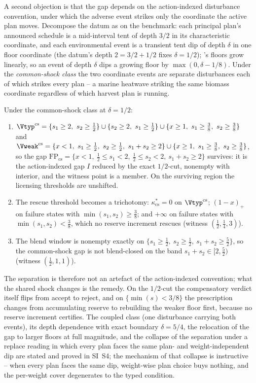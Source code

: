 A second objection is that the gap depends on the action-indexed disturbance convention, under which the adverse event strikes only the coordinate the active plan moves. Decompose the datum as on the benchmark: each principal plan's announced schedule is a mid-interval tent of depth $3/2$ in its characteristic coordinate, and each environmental event is a transient tent dip of depth $\delta$ in one floor coordinate (the datum's depth $2=3/2+1/2$ fixes $\delta=1/2$); 's floors grow linearly, so an event of depth $\delta$ dips a growing floor by $\max(0,\delta-1/8)$. Under the \emph{common-shock class} the two coordinate events are separate disturbances each of which strikes every plan -- a marine heatwave striking the same biomass coordinate regardless of which harvest plan is running.

\begin{proposition}\label{prop:commonshock}
Under the common-shock class at $\delta=1/2$:
\begin{enumerate}[label=\textup{(\roman*)},leftmargin=2em]
\item $\Vtyp^{\mathrm{cs}}=\{s_1\ge2,\ s_2\ge\tfrac12\}\cup\{s_2\ge2,\ s_1\ge\tfrac12\}\cup\{x\ge1,\ s_1\ge\tfrac38,\ s_2\ge\tfrac38\}$ and
$\Vweak^{\mathrm{cs}}=\{x<1,\ s_1\ge\tfrac12,\ s_2\ge\tfrac12,\ s_1+s_2\ge2\}\cup\{x\ge1,\ s_1\ge\tfrac38,\ s_2\ge\tfrac38\}$, so the gap
$\mathrm{FP}_{\mathrm{cs}}=\{x<1,\ \tfrac12\le s_1<2,\ \tfrac12\le s_2<2,\ s_1+s_2\ge2\}$
survives: it is the action-indexed gap $I$ reduced by the exact $1/2$-cut, nonempty with interior, and the witness point is a member. On the surviving region the licensing thresholds are unshifted.
\item The rescue threshold becomes a trichotomy: $\kappa^*_{\mathrm{cs}}=0$ on $\Vtyp^{\mathrm{cs}}$; $(1-x)_+$ on failure states with $\min(s_1,s_2)\ge\tfrac38$; and $+\infty$ on failure states with $\min(s_1,s_2)<\tfrac38$, which no reserve increment rescues (witness $(\tfrac12,\tfrac14,3)$).
\item The blend window is nonempty exactly on $\{s_1\ge\tfrac12,\ s_2\ge\tfrac12,\ s_1+s_2\ge\tfrac52\}$, so the common-shock gap is not blend-closed on the band $s_1+s_2\in[2,\tfrac52)$ (witness $(\tfrac12,1,1)$).
\end{enumerate}
\end{proposition}

The separation is therefore not an artefact of the action-indexed convention; what the shared shock changes is the remedy. On the $1/2$-cut the compensatory verdict itself flips from accept to reject, and on $\{\min(s)<3/8\}$ the prescription changes from accumulating reserve to rebuilding the weaker floor first, because no reserve increment certifies. The coupled class (one disturbance carrying both events), its depth dependence with exact boundary $\delta=5/4$, the relocation of the gap to larger floors at full magnitude, and the collapse of the separation under a replace reading in which every plan faces the same plan- and weight-independent dip are stated and proved in SI~S4; the mechanism of that collapse is instructive -- when every plan faces the same dip, weight-wise plan choice buys nothing, and the per-weight cover degenerates to the typed condition.

